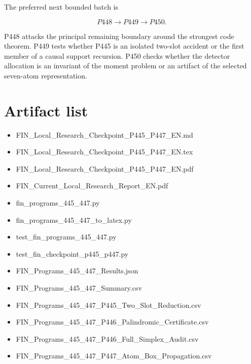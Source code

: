 \documentclass[11pt,a4paper,openany]{report}
\begin{document}
The preferred next bounded batch is

\[
\boxed{P448\to P449\to P450.}
\]

P448 attacks the principal remaining boundary around the strongest code theorem. P449 tests whether P445 is an isolated two-slot accident or the first member of a causal support recursion. P450 checks whether the detector allocation is an invariant of the moment problem or an artifact of the selected seven-atom representation.

\chapter{Artifact list}

\begin{itemize}
\item 
FIN\_Local\_Research\_Checkpoint\_P445\_P447\_EN.md

\item 
FIN\_Local\_Research\_Checkpoint\_P445\_P447\_EN.tex

\item 
FIN\_Local\_Research\_Checkpoint\_P445\_P447\_EN.pdf

\item 
FIN\_Current\_Local\_Research\_Report\_EN.pdf

\item 
fin\_programs\_445\_447.py

\item 
fin\_programs\_445\_447\_to\_latex.py

\item 
test\_fin\_programs\_445\_447.py

\item 
test\_fin\_checkpoint\_p445\_p447.py

\item 
FIN\_Programs\_445\_447\_Results.json

\item 
FIN\_Programs\_445\_447\_Summary.csv

\item 
FIN\_Programs\_445\_447\_P445\_Two\_Slot\_Reduction.csv

\item 
FIN\_Programs\_445\_447\_P446\_Palindromic\_Certificate.csv

\item 
FIN\_Programs\_445\_447\_P446\_Full\_Simplex\_Audit.csv

\item 
FIN\_Programs\_445\_447\_P447\_Atom\_Box\_Propagation.csv


\end{itemize}
\end{document}
